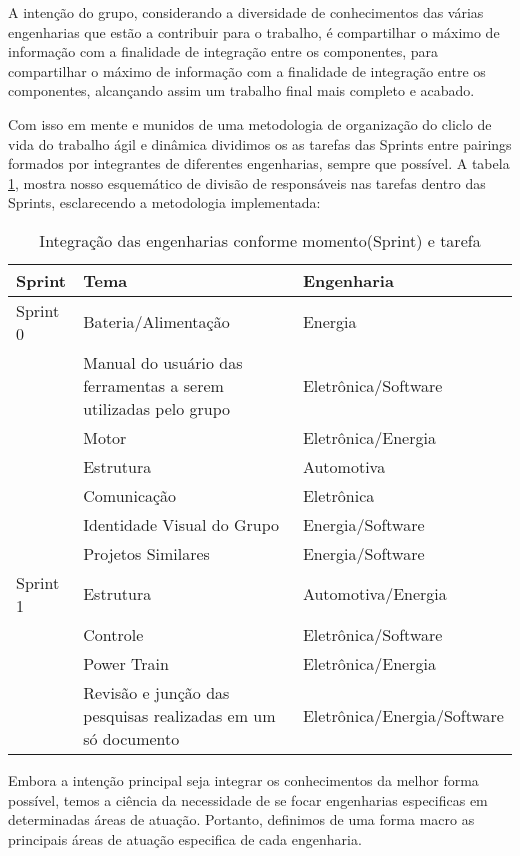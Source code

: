 A intenção do grupo, considerando a diversidade de conhecimentos das várias engenharias que estão a contribuir para o trabalho, é compartilhar o máximo de informação com a finalidade de integração entre os componentes, para compartilhar o máximo de informação com a finalidade de integração entre os componentes, alcançando assim um trabalho final mais completo e acabado.

Com isso em mente e munidos de uma metodologia de organização do cliclo de vida do trabalho ágil e dinâmica dividimos os as tarefas das Sprints entre pairings formados por integrantes de diferentes engenharias, sempre que possível. A tabela \ref{tab:integracao}, mostra nosso esquemático de divisão de responsáveis nas tarefas dentro das Sprints, esclarecendo a metodologia implementada:


\begin{table}[]
\centering
\caption{Integração das engenharias conforme momento(Sprint) e tarefa}
\begin{tabular}{|p{2cm}|p{6cm}|p{5cm}|}
\hline
Sprint & Tema & Engenharia \\ \hline
Sprint 0 & Bateria/Alimentação & Energia \\ \hline
 & Manual do usuário das ferramentas a serem utilizadas pelo grupo & Eletrônica/Software \\ \hline
 & Motor & Eletrônica/Energia \\ \hline
 & Estrutura & Automotiva \\ \hline
 & Comunicação & Eletrônica \\ \hline
 & Identidade Visual do Grupo & Energia/Software \\ \hline
 & Projetos Similares & Energia/Software \\ \hline
Sprint 1 & Estrutura & Automotiva/Energia \\ \hline
 & Controle & Eletrônica/Software \\ \hline
 & Power Train & Eletrônica/Energia \\ \hline
 & Revisão e junção das pesquisas realizadas em um só documento & Eletrônica/Energia/Software \\ \hline
\end{tabular}
\label{tab:integracao}
\end{table}

Embora a intenção principal seja integrar os conhecimentos da melhor forma possível, temos a ciência da necessidade de se focar engenharias especificas em determinadas áreas de atuação. Portanto, definimos de uma forma macro as principais áreas de atuação especifica de cada engenharia.

